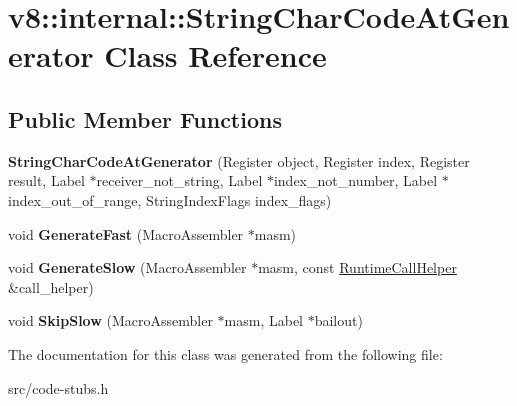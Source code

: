 \hypertarget{classv8_1_1internal_1_1_string_char_code_at_generator}{}\section{v8\+:\+:internal\+:\+:String\+Char\+Code\+At\+Generator Class Reference}
\label{classv8_1_1internal_1_1_string_char_code_at_generator}
\subsection*{Public Member Functions}
\begin{DoxyCompactItemize}
\item 
\hypertarget{classv8_1_1internal_1_1_string_char_code_at_generator_a5876266950df6981bf6f0e5c3a246e0a}{}{\bfseries String\+Char\+Code\+At\+Generator} (Register object, Register index, Register result, Label $\ast$receiver\+\_\+not\+\_\+string, Label $\ast$index\+\_\+not\+\_\+number, Label $\ast$index\+\_\+out\+\_\+of\+\_\+range, String\+Index\+Flags index\+\_\+flags)\label{classv8_1_1internal_1_1_string_char_code_at_generator_a5876266950df6981bf6f0e5c3a246e0a}

\item 
\hypertarget{classv8_1_1internal_1_1_string_char_code_at_generator_a9d060d07da2596360ac418290bb7073f}{}void {\bfseries Generate\+Fast} (Macro\+Assembler $\ast$masm)\label{classv8_1_1internal_1_1_string_char_code_at_generator_a9d060d07da2596360ac418290bb7073f}

\item 
\hypertarget{classv8_1_1internal_1_1_string_char_code_at_generator_aead1aade5c4c69367ac3ba9122662c5d}{}void {\bfseries Generate\+Slow} (Macro\+Assembler $\ast$masm, const \hyperlink{classv8_1_1internal_1_1_runtime_call_helper}{Runtime\+Call\+Helper} \&call\+\_\+helper)\label{classv8_1_1internal_1_1_string_char_code_at_generator_aead1aade5c4c69367ac3ba9122662c5d}

\item 
\hypertarget{classv8_1_1internal_1_1_string_char_code_at_generator_ac71b49ded4155b066f9ec6797877a9cd}{}void {\bfseries Skip\+Slow} (Macro\+Assembler $\ast$masm, Label $\ast$bailout)\label{classv8_1_1internal_1_1_string_char_code_at_generator_ac71b49ded4155b066f9ec6797877a9cd}

\end{DoxyCompactItemize}


The documentation for this class was generated from the following file\+:\begin{DoxyCompactItemize}
\item 
src/code-\/stubs.\+h\end{DoxyCompactItemize}
